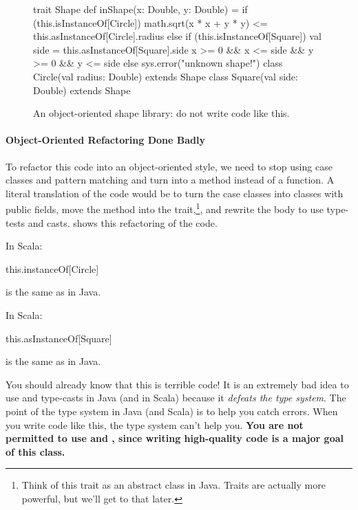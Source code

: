 \documentclass[9pt]{extbook}
\begin{document}
\begin{figure}
\begin{scalacode}
trait Shape {
  def inShape(x: Double, y: Double) = {
    if (this.isInstanceOf[Circle]) {
      math.sqrt(x * x + y * y) <= this.asInstanceOf[Circle].radius
    }
    else if (this.isInstanceOf[Square]) {
      val side = this.asInstanceOf[Square].side
      x >= 0 && x <= side && y >= 0 && y <= side
    }
    else {
      sys.error("unknown shape!")
    }
  }
}
class Circle(val radius: Double) extends Shape
class Square(val side: Double) extends Shape
\end{scalacode}
\caption{An object-oriented shape library: do not write code like this.}
\label{jshapesbad}
\end{figure}

\paragraph{Object-Oriented Refactoring Done Badly} To refactor this code into an
object-oriented style, we need to stop using case classes and pattern matching
and turn  into a method instead of a function.
A literal translation of the code would be to turn the case classes
into classes with public fields, move the method into the 
trait,\footnote{Think of this trait as an abstract class in Java. Traits are actually more powerful, but we'll get to that later.}, and rewrite the body to
use type-tests and casts.
  shows this refactoring of the
code.

\begin{notation}
In Scala:
\begin{scalacode}
this.instanceOf[Circle]
\end{scalacode}
is the same as
 in Java.

In Scala:
\begin{scalacode}
this.asInstanceOf[Square]
\end{scalacode}
is the same as  in Java.
\end{notation}

You should already know that this is terrible code! It is an extremely bad idea
to use  and type-casts in Java (and in Scala) because it
\emph{defeats the type system}. The point of the type system in Java (and Scala)
is to help you catch errors. When you write code like this, the type system
can't help you.
\textbf{You are not permitted to use  and ,
since writing high-quality code is a major goal of this class.}
\end{document}
